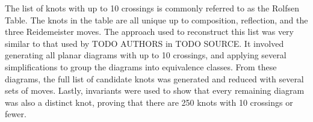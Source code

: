 
\theorems

\begin{paperabstract}
The list of knots with up to 10 crossings is commonly referred to as the Rolfsen
Table.
The knots in the table are all unique up to composition, reflection, and the
three Reidemeister moves.
The approach used to reconstruct this list was very similar to that used by TODO
AUTHORS in TODO SOURCE.
It involved generating all planar diagrams with up to 10 crossings, and applying
several simplifications to group the diagrams into equivalence classes.
From these diagrams, the full list of candidate knots was generated and reduced
with several sets of moves.
Lastly, invariants were used to show that every remaining diagram was also a
distinct knot, proving that there are 250 knots with 10 crossings or fewer.
\end{paperabstract}
